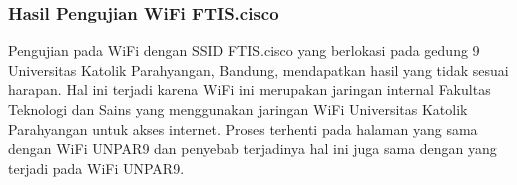 \subsubsection{Hasil Pengujian WiFi FTIS.cisco}
\label{subsubsec:ftis_cisco}

Pengujian pada WiFi dengan SSID FTIS.cisco yang berlokasi pada gedung 9 Universitas Katolik Parahyangan, Bandung, mendapatkan hasil yang tidak sesuai harapan. Hal ini terjadi karena WiFi ini merupakan jaringan internal Fakultas Teknologi dan Sains yang menggunakan jaringan WiFi Universitas Katolik Parahyangan untuk akses internet. Proses terhenti pada halaman yang sama dengan WiFi UNPAR9 dan penyebab terjadinya hal ini juga sama dengan yang terjadi pada WiFi UNPAR9.